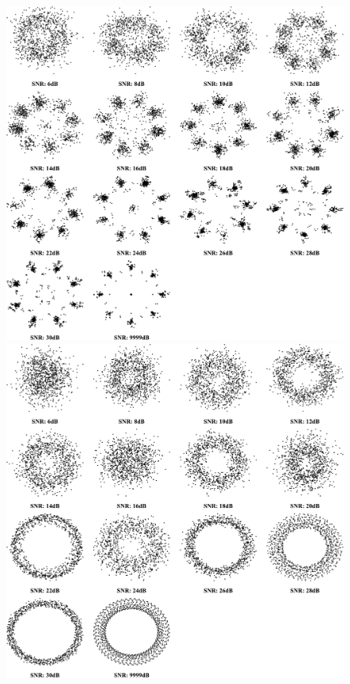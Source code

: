 {
    \begin{figure}[!htbp]
        \centering
        \begin{minipage}{0.48\textwidth}
            \centering
            \includegraphics[scale=0.15]{img/constellations/cropped_constellation8PSK.pdf}
        \end{minipage}
        \hfill
        \begin{minipage}{0.48\textwidth}
            \centering
            \includegraphics[scale=0.15]{img/constellations/cropped_constellationAM-DSB-SC.pdf}
        \end{minipage}
    \end{figure}
}


